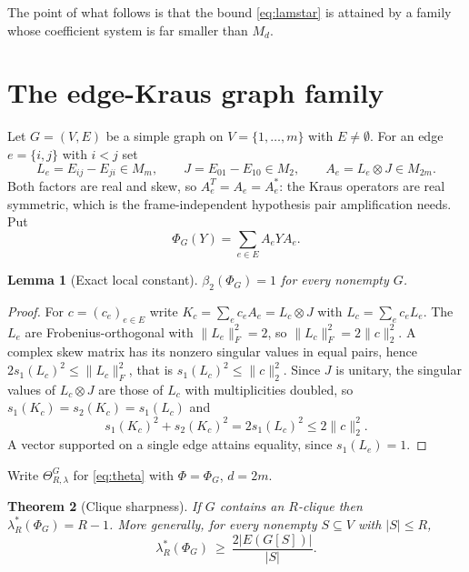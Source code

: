 \documentclass[11pt,reqno]{amsart}
\theoremstyle{plain}
\newtheorem{theorem}{Theorem}[section]
\newtheorem{lemma}[theorem]{Lemma}
\theoremstyle{remark}
\newcommand{\norm}[1]{\lVert #1\rVert}
\newcommand{\abs}[1]{\lvert #1\rvert}
\begin{document}
The point of what follows is that the bound \cref{eq:lamstar} is attained by a
family whose coefficient system is far smaller than $M_d$.

\section{The edge-Kraus graph family}

Let $G=(V,E)$ be a simple graph on $V=\{1,\dots,m\}$ with $E\neq\emptyset$.
For an edge $e=\{i,j\}$ with $i<j$ set
\begin{equation}
\label{eq:kraus}
    L_e=E_{ij}-E_{ji}\in M_m,
    \qquad
    J=E_{01}-E_{10}\in M_2,
    \qquad
    A_e=L_e\otimes J\in M_{2m}.
\end{equation}
Both factors are real and skew, so $A_e^T=A_e=A_e^*$: the Kraus operators are
real symmetric, which is the frame-independent hypothesis pair amplification
needs.  Put
\begin{equation}
\label{eq:phig}
    \Phi_G(Y)=\sum_{e\in E}A_eYA_e .
\end{equation}

\begin{lemma}[Exact local constant]
\label{lem:beta}
$\beta_2(\Phi_G)=1$ for every nonempty $G$.
\end{lemma}

\begin{proof}
For $c=(c_e)_{e\in E}$ write $K_c=\sum_ec_eA_e=L_c\otimes J$ with
$L_c=\sum_ec_eL_e$.  The $L_e$ are Frobenius-orthogonal with
$\norm{L_e}_F^2=2$, so $\norm{L_c}_F^2=2\norm c_2^2$.  A complex skew matrix
has its nonzero singular values in equal pairs, hence
$2s_1(L_c)^2\le\norm{L_c}_F^2$, that is $s_1(L_c)^2\le\norm c_2^2$.  Since $J$
is unitary, the singular values of $L_c\otimes J$ are those of $L_c$ with
multiplicities doubled, so $s_1(K_c)=s_2(K_c)=s_1(L_c)$ and
\[
    s_1(K_c)^2+s_2(K_c)^2=2s_1(L_c)^2\le2\norm c_2^2 .
\]
A vector supported on a single edge attains equality, since $s_1(L_e)=1$.
\end{proof}

Write $\Theta^G_{R,\lambda}$ for \cref{eq:theta} with $\Phi=\Phi_G$, $d=2m$.

\begin{theorem}[Clique sharpness]
\label{thm:clique}
If $G$ contains an $R$-clique then $\lambda^*_R(\Phi_G)=R-1$.  More generally,
for every nonempty $S\subseteq V$ with $\abs S\le R$,
\begin{equation}
\label{eq:avgdeg}
    \lambda^*_R(\Phi_G)\ \ge\ \frac{2\abs{E(G[S])}}{\abs S}.
\end{equation}
\end{theorem}
\end{document}
